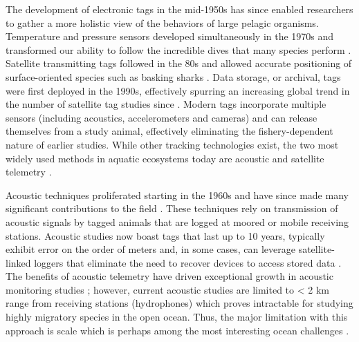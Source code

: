 The development of electronic tags in the mid-1950s has since enabled researchers to gather a more holistic view of the behaviors of large pelagic organisms. Temperature and pressure sensors developed simultaneously in the 1970s and transformed our ability to follow the incredible dives that many species perform \citep{Carey1981}. Satellite transmitting tags followed in the 80s and allowed accurate positioning of surface-oriented species such as basking sharks \citep{Priede1984}. Data storage, or archival, tags were first deployed in the 1990s, effectively spurring an increasing global trend in the number of satellite tag studies since \citep{Hussey2015}. Modern tags incorporate multiple sensors (including acoustics, accelerometers and cameras) and can release themselves from a study animal, effectively eliminating the fishery-dependent nature of earlier studies. While other tracking technologies exist, the two most widely used methods in aquatic ecosystems today are acoustic and satellite telemetry \citep{Hussey2015}.

Acoustic techniques proliferated starting in the 1960s and have since made many significant contributions to the field \citep[\eg][]{Carey1981, Carey1990}. These techniques rely on transmission of acoustic signals by tagged animals that are logged at moored or mobile receiving stations. Acoustic studies now boast tags that last up to 10 years, typically exhibit error on the order of meters and, in some cases, can leverage satellite-linked loggers that eliminate the need to recover devices to access stored data \citep{Donaldson2014}. The benefits of acoustic telemetry have driven exceptional growth in acoustic monitoring studies \citep{Hussey2015}; however, current acoustic studies are limited to < 2 km range from receiving stations (\eg hydrophones) which proves intractable for studying highly migratory species in the open ocean. Thus, the major limitation with this approach is scale which is perhaps among the most interesting ocean challenges \citep{Stommel1963, Haury1978}. 

